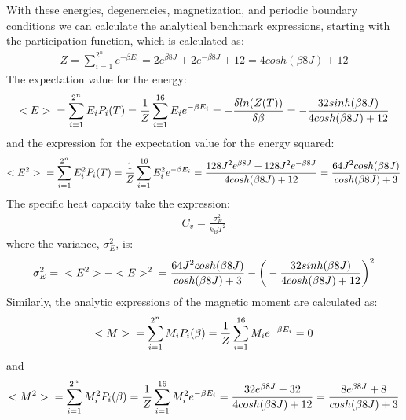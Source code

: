 \documentclass[12pt,english,a4paper]{article}
\begin{document}
With these energies, degeneracies, magnetization, and periodic boundary conditions we can calculate the analytical benchmark expressions, starting with the participation function, which is calculated as: 
\begin{align*}
    Z = \sum_{i=1}^{2^n} e^{-\beta E_i}
      = 2e^{\beta 8J} + 2e^{-\beta 8J} + 12
      = 4cosh(\beta 8J) + 12
\end{align*}
The expectation value for the energy:
\begin{align*}
    <E> \hspace{0.2cm} 
        = \sum_{i=1}^{2^n} E_iP_i(T) 
        = \frac{1}{Z} \sum_{i=1}^{16} E_ie^{-\beta E_i}
        = - \frac{\delta ln(Z(T))}{\delta \beta}
        = -\frac{32sinh(\beta 8J)}{4cosh(\beta 8J) + 12}
\end{align*}
and the expression for the expectation value for the energy squared:
\begin{align*}
    <E^2> \hspace{0.2cm} 
          = \sum_{i=1}^{2^n} E_i^2P_i(T) 
          = \frac{1}{Z} \sum_{i=1}^{16} E_i^2e^{-\beta E_i}
          = \frac{128J^2e^{\beta 8J} + 128J^2e^{-\beta 8J}}
                 {4cosh(\beta 8J) + 12}
          = \frac{64J^2cosh(\beta 8J)}{cosh(\beta 8J) + 3}
\end{align*}
The specific heat capacity take the expression:
\begin{align*}
    C_v = \frac{\sigma_E^2}{k_BT^2} 
\end{align*}
where the variance, $\sigma_E^2$, is: 
\begin{align*}
    \sigma_E^2 = \hspace{0.2cm} <E^2> - <E>^2 \hspace{0.2cm}
               = \frac{64J^2cosh(\beta 8J)}{cosh(\beta 8J) + 3}
               - \bigg(-\frac{32sinh(\beta 8J)}{4cosh(\beta 8J) + 12}\bigg)^2
\end{align*}
Similarly, the analytic expressions of the magnetic moment are calculated as:
\begin{align*}
    <M> \hspace{0.2cm} 
        = \sum_{i=1}^{2^n} M_iP_i(\beta) 
        = \frac{1}{Z} \sum_{i=1}^{16} M_ie^{-\beta E_i} = 0 
\end{align*}
and
\begin{align*}
    <M^2> \hspace{0.2cm} 
          = \sum_{i=1}^{2^n} M_i^2P_i(\beta) 
          = \frac{1}{Z} \sum_{i=1}^{16} M_i^2e^{-\beta E_i}
          = \frac{32e^{\beta 8J} + 32}
                 {4cosh(\beta 8J) + 12}
          = \frac{8e^{\beta 8J} + 8}{cosh(\beta 8J) + 3}
\end{align*}
\end{document}
